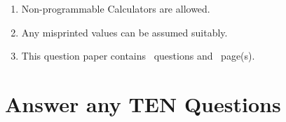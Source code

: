 \documentclass[a4paper,12pt]{vitexam}
\begin{document}
\begin{instructions}
	\begin{enumerate}[label={(\roman*)},itemsep=0pt]
		\item Non-programmable Calculators are allowed.
		\item Any misprinted values can be assumed suitably.
		\item This question paper contains \numquestions\ questions and \numpages\ page(s).
	\end{enumerate}
\end{instructions}
	
	
	
\part{Answer any TEN  Questions}

\end{document}
